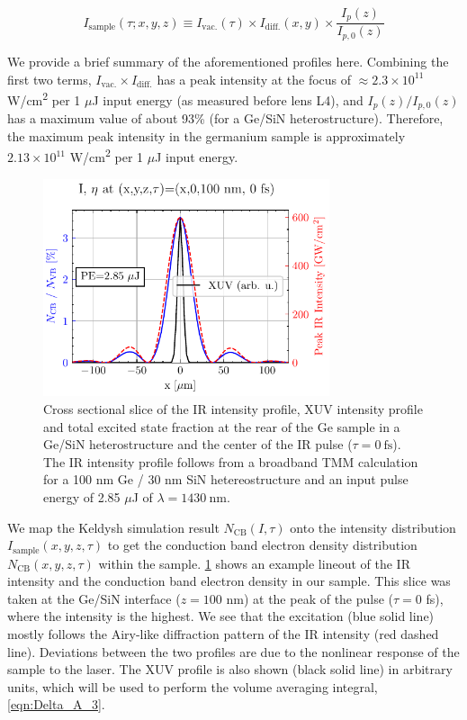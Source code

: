 \begin{equation}
I_{\textrm{sample}}(\tau; x, y, z) \equiv I_{\textrm{vac.}}(\tau) \times I_{\textrm{diff.}}(x, y) \times \frac{I_p(z)}{I_{p,0}(z)}
\label{eqn:sample_intensity_XYZtau}
\end{equation}

We provide a brief summary of the aforementioned profiles here. Combining the first two terms, $I_{\textrm{vac.}} \times I_{\textrm{diff.}}$ has a peak intensity at the focus of $\approx 2.3 \times 10^{11}$ W/cm\textsuperscript{2} per 1 $\mu$J input energy (as measured before lens L4), and $I_p(z) / I_{p,0}(z)$ has a maximum value of about 93\% (for a Ge/SiN heterostructure). Therefore, the maximum peak intensity in the germanium sample is approximately $2.13 \times 10^{11}$ W/cm\textsuperscript{2} per 1 $\mu$J input energy. 

\begin{figure}
	\centering
	\includegraphics[width=0.75\textwidth]{figures/chap4/excitation_at_focus.pdf}
	\caption{Cross sectional slice of the IR intensity profile, XUV intensity profile and total excited state fraction at the rear of the Ge sample in a Ge/SiN heterostructure and the center of the IR pulse ($\tau = 0 \ \textrm{fs}$). The IR intensity profile follows from a broadband TMM calculation for a 100 nm Ge / 30 nm SiN hetereostructure and an input pulse energy of 2.85 $\mu$J of $\lambda = 1430 \ \textrm{nm}$.}
	\label{fig:excitation_at_focus}
\end{figure}

We map the Keldysh simulation result $N_{\textrm{CB}}(I, \tau)$ onto the intensity distribution $I_{\textrm{sample}}(x, y, z, \tau)$ to get the conduction band electron density distribution $N_{\textrm{CB}}(x, y, z, \tau)$ within the sample. \cref{fig:excitation_at_focus} shows an example lineout of the IR intensity and the conduction band electron density in our sample. This slice was taken at the Ge/SiN interface ($z=100$ nm) at the peak of the pulse ($\tau=0$ fs), where the intensity is the highest. We see that the excitation (blue solid line) mostly follows the Airy-like diffraction pattern of the IR intensity (red dashed line). Deviations between the two profiles are due to the nonlinear response of the sample to the laser. The XUV profile is also shown (black solid line) in arbitrary units, which will be used to perform the volume averaging integral, \cref{eqn:Delta_A_3}.

